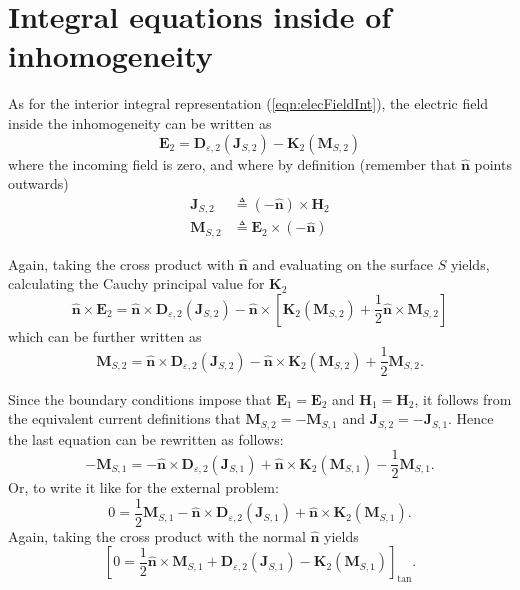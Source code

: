 \documentclass[a4paper,10pt]{book}
\newcommand{\field}[1]{\mathbf{#1}}
\newcommand{\current}[1]{\mathbf{#1}}
\newcommand{\vect}[1]{\mathbf{#1}}
\newcommand{\operator}[1]{\mathbf{#1}}
\begin{document}
\section{Integral equations inside of inhomogeneity}
%
\par
As for the interior integral representation (\ref{eqn:elecFieldInt}), the electric field inside the inhomogeneity can be written as
\begin{equation}
\field{E}_2 = \operator{D}_{\varepsilon, 2}\left(\current{J}_{S,2}\right) - \operator{K}_{2}\left(\current{M}_{S,2}\right)
\end{equation}
where the incoming field is zero, and where by definition (remember that $\vect{\hat{n}}$ points outwards)
\begin{align}
\current{J}_{S,2} &\triangleq (-\vect{\hat{n}}) \times \field{H}_2 \\
\current{M}_{S,2} &\triangleq \field{E}_2 \times (-\vect{\hat{n}}) 
\end{align}
%
\par
Again, taking the cross product with $\vect{\hat{n}}$ and evaluating on the surface $S$ yields, calculating the Cauchy principal value for $\operator{K}_2$
\begin{equation}
\vect{\hat{n}} \times \field{E}_2 = \vect{\hat{n}} \times \operator{D}_{\varepsilon, 2}\left(\current{J}_{S,2}\right) - \vect{\hat{n}} \times \left[\operator{K}_{2}\left(\current{M}_{S,2}\right)+ \frac{1}{2}\vect{\hat{n}} \times \current{M}_{S,2} \right]
\end{equation}
which can be further written as
\begin{equation}
\current{M}_{S,2} = \vect{\hat{n}} \times \operator{D}_{\varepsilon, 2}\left(\current{J}_{S,2}\right) - \vect{\hat{n}} \times \operator{K}_{2}\left(\current{M}_{S,2}\right)+ \frac{1}{2} \current{M}_{S,2}.
\end{equation}
%
\par
Since the boundary conditions impose that $\field{E}_1 = \field{E}_2$ and $\field{H}_1 = \field{H}_2$, it follows from the equivalent current definitions that $\current{M}_{S,2} = -\current{M}_{S,1}$ and $\current{J}_{S,2} = -\current{J}_{S,1}$. Hence the last equation can be rewritten as follows:
\begin{equation}
-\current{M}_{S,1} = -\vect{\hat{n}} \times \operator{D}_{\varepsilon, 2}\left(\current{J}_{S,1}\right) + \vect{\hat{n}} \times \operator{K}_{2}\left(\current{M}_{S,1}\right)- \frac{1}{2} \current{M}_{S,1}.
\end{equation}
Or, to write it like for the external problem:
\begin{equation}
0 = \frac{1}{2} \current{M}_{S,1} -\vect{\hat{n}} \times \operator{D}_{\varepsilon, 2}\left(\current{J}_{S,1}\right) + \vect{\hat{n}} \times \operator{K}_{2}\left(\current{M}_{S,1}\right).
\end{equation}
Again, taking the cross product with the normal $\vect{\hat{n}}$ yields
\begin{equation}\label{eqn:EFIE_2}
\boxed{
\left[ 0 =  \frac{1}{2}\vect{\hat{n}}\times \current{M}_{S,1} + \operator{D}_{\varepsilon, 2}\left(\current{J}_{S,1}\right) - \operator{K}_{2}\left(\current{M}_{S,1}\right) \right]_\text{tan} }.
\end{equation}
\end{document}
